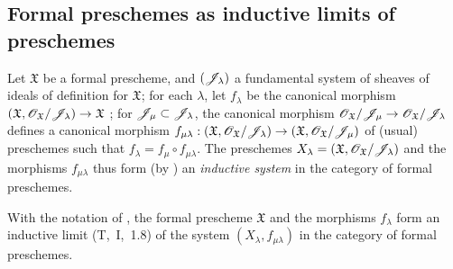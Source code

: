 \subsection{Formal preschemes as inductive limits of preschemes}
\label{subsection:1.10.6}

\begin{env}[10.6.1]
\label{1.10.6.1}
Let $\mathfrak{X}$ be a formal prescheme, and $(\mathscr{J}_\lambda)$ a fundamental system of sheaves of ideals of definition for $\mathfrak{X}$; for each $\lambda$, let $f_\lambda$ be the canonical morphism $(\mathfrak{X},\sh{O}_\mathfrak{X}/\sh{J}_\lambda)\to\mathfrak{X}$ ; for $\mathscr{J}_\mu\subset\mathscr{J}_\lambda$, the canonical morphism $\sh{O}_\mathfrak{X}/\sh{J}_\mu\to\sh{O}_\mathfrak{X}/\sh{J}_\lambda$ defines a canonical morphism
$f_{\mu\lambda}:(\mathfrak{X},\sh{O}_\mathfrak{X}/\sh{J}_\lambda)\to(\mathfrak{X},\sh{O}_\mathfrak{X}/\sh{J}_\mu)$ of (usual) preschemes such that $f_\lambda=f_\mu\circ f_{\mu\lambda}$.
The preschemes $X_\lambda=(\mathfrak{X},\mathscr{O}_\mathfrak{X}/\mathscr{J}_\lambda)$ and the morphisms $f_{\mu\lambda}$ thus form (by ) an \emph{inductive system} in the category of formal preschemes.
\end{env}

\begin{proposition}[10.6.2]
\label{1.10.6.2}
With the notation of , the formal prescheme $\mathfrak{X}$ and the morphisms $f_\lambda$ form an inductive limit (T,~I,~1.8) of the system $(X_\lambda,f_{\mu\lambda})$ in the category of formal preschemes.
\end{proposition}

